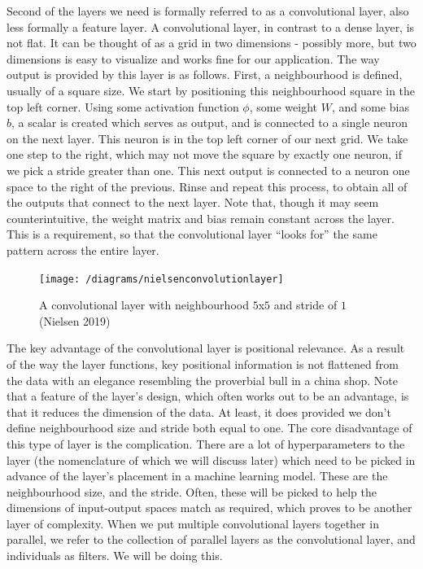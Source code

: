 \documentclass{article}
\begin{document}
Second of the layers we need is formally referred to as a convolutional layer, also less formally a feature layer. A convolutional layer, in contrast to a dense layer, is not flat. It can be thought of as a grid in two dimensions - possibly more, but two dimensions is easy to visualize and works fine for our application. The way output is provided by this layer is as follows. First, a neighbourhood is defined, usually of a square size. We start by positioning this neighbourhood square in the top left corner. Using some activation function $\phi$, some weight $W$, and some bias $b$, a scalar is created which serves as output, and is connected to a single neuron on the next layer. This neuron is in the top left corner of our next grid. We take one step to the right, which may not move the square by exactly one neuron, if we pick a stride greater than one. This next output is connected to a neuron one space to the right of the previous. Rinse and repeat this process, to obtain all of the outputs that connect to the next layer. Note that, though it may seem counterintuitive, the weight matrix and bias remain constant across the layer. This is a requirement, so that the convolutional layer “looks for” the same pattern across the entire layer.
\begin{figure}[H]
\texttt{[image: /diagrams/nielsenconvolutionlayer]}
\caption{A convolutional layer with neighbourhood $5$x$5$ and stride of $1$ (Nielsen 2019)}
\end{figure}

The key advantage of the convolutional layer is positional relevance. As a result of the way the layer functions, key positional information is not flattened from the data with an elegance resembling the proverbial bull in a china shop. Note that a feature of the layer’s design, which often works out to be an advantage, is that it reduces the dimension of the data. At least, it does provided we don’t define neighbourhood size and stride both equal to one. The core disadvantage of this type of layer is the complication. There are a lot of hyperparameters to the layer (the nomenclature of which we will discuss later) which need to be picked in advance of the layer’s placement in a machine learning model. These are the neighbourhood size, and the stride. Often, these will be picked to help the dimensions of input-output spaces match as required, which proves to be another layer of complexity. When we put multiple convolutional layers together in parallel, we refer to the collection of parallel layers as the convolutional layer, and individuals as filters. We will be doing this.\\\\
\end{document}
